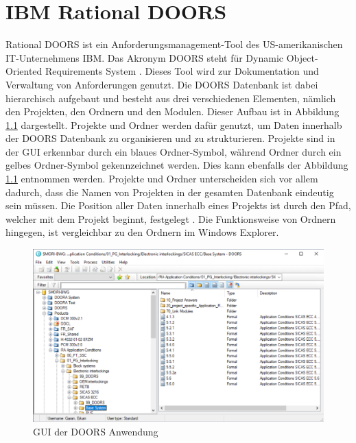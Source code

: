 \chapter{IBM Rational DOORS}
\label{chap:kapitel3}

Rational DOORS ist ein Anforderungsmanagement-Tool des US-amerikanischen IT-Unternehmens IBM. Das Akronym \acs{DOORS} steht für Dynamic Object-Oriented Requirements System \cite[]{q5}.
Dieses Tool wird zur Dokumentation und Verwaltung von Anforderungen genutzt. Die \acs{DOORS} Datenbank ist dabei hierarchisch aufgebaut und besteht aus drei verschiedenen Elementen, nämlich den 
Projekten, den Ordnern und den Modulen. Dieser Aufbau ist in Abbildung \ref*{fig:Doors GUI} dargestellt. Projekte und Ordner werden dafür genutzt, um Daten innerhalb der \acs{DOORS} Datenbank 
zu organisieren und zu strukturieren. Projekte sind in der GUI erkennbar durch ein blaues Ordner-Symbol, während Ordner durch ein gelbes Ordner-Symbol gekennzeichnet werden. Dies kann ebenfalls der 
Abbildung \ref*{fig:Doors GUI} entnommen werden. Projekte und Ordner unterscheiden sich vor allem dadurch, dass die Namen von Projekten in der gesamten Datenbank eindeutig sein müssen. 
Die Position aller Daten innerhalb eines Projekts ist durch den Pfad, welcher mit dem Projekt beginnt, festgelegt \cite[]{q6}. Die Funktionsweise von Ordnern hingegen, ist vergleichbar 
zu den Ordnern im Windows Explorer.     

\begin{figure}[H]
    \centering
    \includegraphics[width = \textwidth]{abbildungen/IBM Doors.PNG}
    \caption{GUI der \acs{DOORS} Anwendung}
    \label{fig:Doors GUI}
\end{figure}


